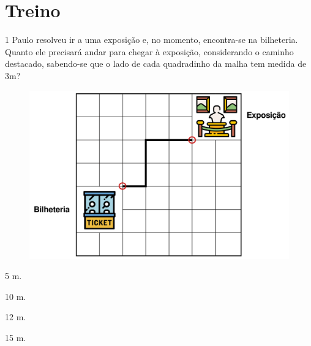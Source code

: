 \section*{Treino}

\num{1} Paulo resolveu ir a uma exposição e, no momento, encontra-se na
bilheteria. Quanto ele precisará andar para chegar à exposição,
considerando o caminho destacado, sabendo-se que o lado de cada
quadradinho da malha tem medida de 3m?\enlargethispage{3\baselineskip}

\begin{figure}[htpb!]
\centering
\includegraphics[width=.8\textwidth]{./media/image61.png}
\end{figure}
\pagebreak

\begin{multicols}{2}
\begin{escolha}
\item
  5 m.
\item
  10 m.
\item
  12 m.
\item
  15 m.
\end{escolha}
\end{multicols}

